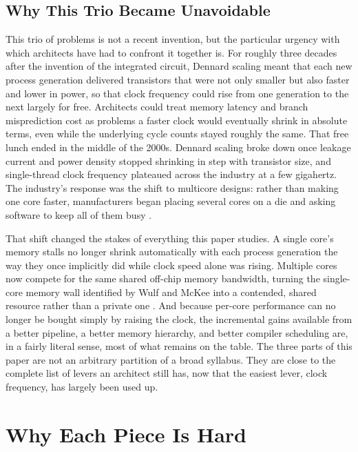\documentclass[11pt,a4paper]{report}
\begin{document}
\subsection{Why This Trio Became Unavoidable}
\label{subsec:historical-turn}

This trio of problems is not a recent invention, but the particular
urgency with which architects have had to confront it together is. For
roughly three decades after the invention of the integrated circuit,
Dennard scaling meant that each new process generation delivered
transistors that were not only smaller but also faster and lower in
power, so that clock frequency could rise from one generation to the
next largely for free. Architects could treat memory latency and branch
misprediction cost as problems a faster clock would eventually shrink in
absolute terms, even while the underlying cycle counts stayed roughly
the same. That free lunch ended in the middle of the 2000s. Dennard
scaling broke down once leakage current and power density stopped
shrinking in step with transistor size, and single-thread clock
frequency plateaued across the industry at a few gigahertz. The
industry's response was the shift to multicore designs: rather than
making one core faster, manufacturers began placing several cores on a
die and asking software to keep all of them busy \cite{esmaeilzadeh2011}.

That shift changed the stakes of everything this paper studies. A single
core's memory stalls no longer shrink automatically with each process
generation the way they once implicitly did while clock speed alone was
rising. Multiple cores now compete for the same shared off-chip memory
bandwidth, turning the single-core memory wall identified by Wulf and
McKee into a contended, shared resource rather than a private one
\cite{wulfmckee1995}. And because per-core performance can no longer be
bought simply by raising the clock, the incremental gains available from
a better pipeline, a better memory hierarchy, and better compiler
scheduling are, in a fairly literal sense, most of what remains on the
table. The three parts of this paper are not an arbitrary partition of a
broad syllabus. They are close to the complete list of levers an
architect still has, now that the easiest lever, clock frequency, has
largely been used up.

\section{Why Each Piece Is Hard}
\label{sec:why-hard}
\end{document}
